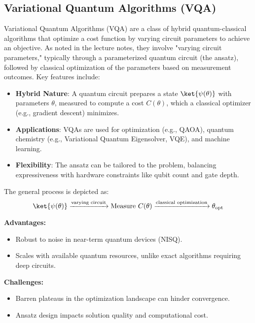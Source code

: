 \subsection*{Variational Quantum Algorithms (VQA)}

Variational Quantum Algorithms (VQA) are a class of hybrid quantum-classical
algorithms that optimize a cost function by varying circuit parameters to
achieve an objective. As noted in the lecture notes, they involve "varying
circuit parameters," typically through a parameterized quantum circuit (the
ansatz), followed by classical optimization of the parameters based on
measurement outcomes. Key features include:

\begin{itemize}
  \item \textbf{Hybrid Nature}: A quantum circuit prepares a state
    $\ket{\psi(\theta)}$ with parameters $\theta$, measured to compute a cost
    $C(\theta)$, which a classical optimizer (e.g., gradient descent) minimizes.

  \item \textbf{Applications}: VQAs are used for optimization (e.g., QAOA),
    quantum chemistry (e.g., Variational Quantum Eigensolver, VQE), and
    machine learning.

  \item \textbf{Flexibility}: The ansatz can be tailored to the problem,
    balancing expressiveness with hardware constraints like qubit count and
    gate depth.
\end{itemize}

The general process is depicted as:
\[
  \ket{\psi(\theta)} \xrightarrow{\text{varying circuit}} \text{Measure }
  C(\theta) \xrightarrow{\text{classical optimization}} \theta_{\text{opt}}
\]

\vspace{0.3cm}

\noindent
\textbf{Advantages:}
\begin{itemize}
  \item Robust to noise in near-term quantum devices (NISQ).

  \item Scales with available quantum resources, unlike exact algorithms
    requiring deep circuits.
\end{itemize}

\vspace{0.3cm}

\noindent
\textbf{Challenges:}
\begin{itemize}
  \item Barren plateaus in the optimization landscape can hinder convergence.

  \item Ansatz design impacts solution quality and computational cost.

\end{itemize}

